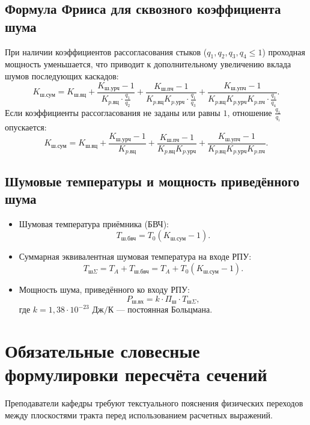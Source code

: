 \documentclass[12pt,a4paper]{article}
\begin{document}
\subsection{Формула Фрииса для сквозного коэффициента шума}
При наличии коэффициентов рассогласования стыков ($q_1, q_2, q_3, q_4 \le 1$) проходная мощность уменьшается, что приводит к дополнительному увеличению вклада шумов последующих каскадов:
\begin{equation}
K_{\text{ш.сум}} = K_{\text{ш.вц}} + \frac{K_{\text{ш.урч}} - 1}{K_{p.\text{вц}} \cdot \frac{q_1}{q_2}} + \frac{K_{\text{ш.пч}} - 1}{K_{p.\text{вц}} K_{p.\text{урч}} \cdot \frac{q_1}{q_3}} + \frac{K_{\text{ш.упч}} - 1}{K_{p.\text{вц}} K_{p.\text{урч}} K_{p.\text{пч}} \cdot \frac{q_1}{q_4}}.
\end{equation}
Если коэффициенты рассогласования не заданы или равны $1$, отношение $\frac{q_1}{q_i}$ опускается:
\begin{equation}
K_{\text{ш.сум}} = K_{\text{ш.вц}} + \frac{K_{\text{ш.урч}} - 1}{K_{p.\text{вц}}} + \frac{K_{\text{ш.пч}} - 1}{K_{p.\text{вц}} K_{p.\text{урч}}} + \frac{K_{\text{ш.упч}} - 1}{K_{p.\text{вц}} K_{p.\text{урч}} K_{p.\text{пч}}}.
\end{equation}

\subsection{Шумовые температуры и мощность приведённого шума}
\begin{itemize}
    \item Шумовая температура приёмника (БВЧ):
    \begin{equation}
    T_{\text{ш.бвч}} = T_0 (K_{\text{ш.сум}} - 1).
    \end{equation}
    \item Суммарная эквивалентная шумовая температура на входе РПУ:
    \begin{equation}
    T_{\text{ш}\Sigma} = T_A + T_{\text{ш.бвч}} = T_A + T_0 (K_{\text{ш.сум}} - 1).
    \end{equation}
    \item Мощность шума, приведённого ко входу РПУ:
    \begin{equation}
    P_{\text{ш.вх}} = k \cdot \Pi_{\text{ш}} \cdot T_{\text{ш}\Sigma},
    \end{equation}
    где $k = 1{,}38 \cdot 10^{-23}\text{ Дж/К}$ --- постоянная Больцмана.
\end{itemize}

\newpage
\section{Обязательные словесные формулировки пересчёта сечений}
Преподаватели кафедры требуют текстуального пояснения физических переходов между плоскостями тракта перед использованием расчетных выражений.
\end{document}
